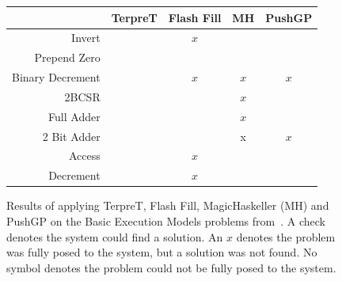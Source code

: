 \begin{figure}
\begin{tabular}{ r | c c c c }
	& TerpreT & Flash Fill & MH & PushGP \\
	\hline
	Invert & \checkmark & $x$ & \checkmark & \checkmark \\
	Prepend Zero & \checkmark & \checkmark & \checkmark & \checkmark \\
	Binary Decrement & \checkmark & $x$ & $x$ & $x$ \\
	2BCSR & \checkmark &  & $x$ & \checkmark \\
	Full Adder & \checkmark &  & $x$ & \checkmark \\
	2 Bit Adder & \checkmark &  & x & $x$ \\
	Access & \checkmark & $x$ & \checkmark & \checkmark \\
	Decrement & \checkmark & $x$ & \checkmark & \checkmark \\
\end{tabular}
\caption{Results of applying TerpreT, Flash Fill, MagicHaskeller (MH) and PushGP on the Basic Execution Models problems from~\cite{Gaunt2016}.  A check denotes the system could find a solution. An $x$ denotes the problem was fully posed to the system, but a solution was not found. No symbol denotes the problem could not be fully posed to the system.}
\label{fig:results1}
\end{figure}

